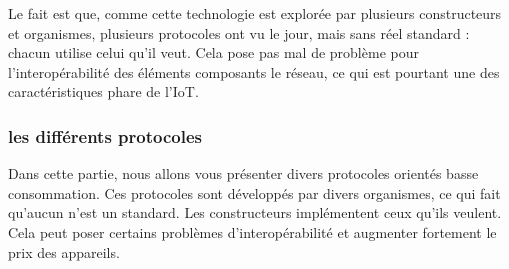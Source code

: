 Le fait est que, comme cette technologie est explorée par plusieurs constructeurs et organismes, plusieurs protocoles ont vu le jour, mais sans réel standard : chacun utilise celui qu'il veut. Cela pose pas mal de problème pour l'interopérabilité des éléments composants le réseau, ce qui est pourtant une des caractéristiques phare de l'IoT.

\subsubsection{les différents protocoles}

Dans cette partie, nous allons vous présenter divers protocoles orientés basse consommation. Ces protocoles sont développés par divers organismes, ce qui fait qu'aucun n'est un standard. Les constructeurs implémentent ceux qu’ils veulent. Cela peut poser certains problèmes d'interopérabilité et augmenter fortement le prix des appareils.

